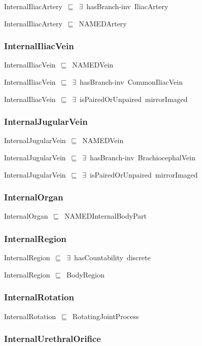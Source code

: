 \documentclass{article}
\begin{document}
InternalIliacArtery~\ensuremath{\sqsubseteq}~\ensuremath{\exists}~hasBranch-inv~IliacArtery~

InternalIliacArtery~\ensuremath{\sqsubseteq}~NAMEDArtery~

\subsubsection*{InternalIliacVein}

InternalIliacVein~\ensuremath{\sqsubseteq}~NAMEDVein~

InternalIliacVein~\ensuremath{\sqsubseteq}~\ensuremath{\exists}~hasBranch-inv~CommonIliacVein~

InternalIliacVein~\ensuremath{\sqsubseteq}~\ensuremath{\exists}~isPairedOrUnpaired~mirrorImaged~

\subsubsection*{InternalJugularVein}

InternalJugularVein~\ensuremath{\sqsubseteq}~NAMEDVein~

InternalJugularVein~\ensuremath{\sqsubseteq}~\ensuremath{\exists}~hasBranch-inv~BrachiocephalVein~

InternalJugularVein~\ensuremath{\sqsubseteq}~\ensuremath{\exists}~isPairedOrUnpaired~mirrorImaged~

\subsubsection*{InternalOrgan}

InternalOrgan~\ensuremath{\sqsubseteq}~NAMEDInternalBodyPart~

\subsubsection*{InternalRegion}

InternalRegion~\ensuremath{\sqsubseteq}~\ensuremath{\exists}~hasCountability~discrete~

InternalRegion~\ensuremath{\sqsubseteq}~BodyRegion~

\subsubsection*{InternalRotation}

InternalRotation~\ensuremath{\sqsubseteq}~RotatingJointProcess~

\subsubsection*{InternalUrethralOrifice}
\end{document}
